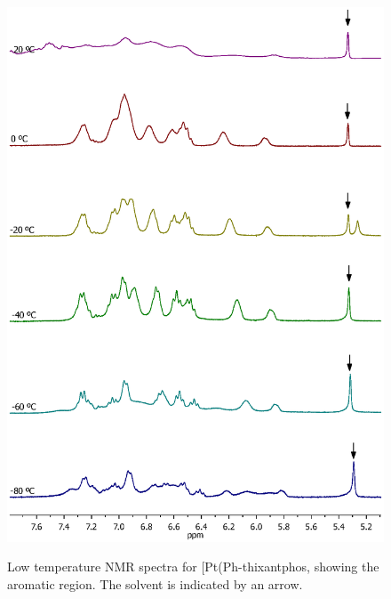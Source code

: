 \begin{figure}[htbp]
\begin{center}
\vspace{0.5cm}
\includegraphics[scale = 0.9, trim = 2cm 2.5cm 1.7cm 4cm, clip]{../NMR/1031-Pt(SPh)2-Proton.eps}
\caption[Low temperature \proton{} NMR spectra for [Pt(Ph-thixantphos\ce{)2}{]}]{Low temperature \proton{} NMR spectra for [Pt(Ph-thixantphos\ce{)2]}, showing the aromatic region.  The solvent  is indicated by an arrow.}
\vspace{0.2cm}
\label{BisSPhPt:HNMR}
\end{center}
\end{figure}
\vspace{0.2cm}

